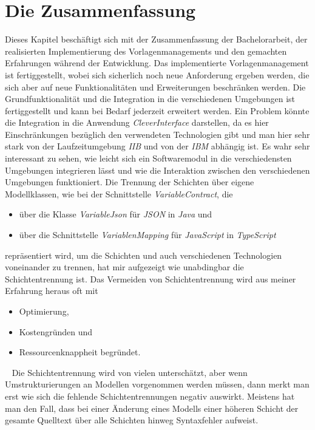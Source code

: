 \chapter{Die Zusammenfassung}
\label{cha:Zusammenfassung}
Dieses Kapitel beschäftigt sich mit der Zusammenfassung der Bachelorarbeit, der realisierten Implementierung des Vorlagenmanagements und den gemachten Erfahrungen während der Entwicklung. Das implementierte Vorlagenmanagement ist fertiggestellt, wobei sich sicherlich noch neue Anforderung ergeben werden, die sich aber auf neue Funktionalitäten und Erweiterungen beschränken werden. Die Grundfunktionalität und die Integration in die verschiedenen Umgebungen ist fertiggestellt und kann bei Bedarf jederzeit erweitert werden. Ein Problem könnte die Integration in die Anwendung \emph{CleverInterface} darstellen, da es hier Einschränkungen bezüglich den verwendeten Technologien gibt und man hier sehr stark von der Laufzeitumgebung \emph{IIB} und von der \emph{IBM} abhängig ist. 
\newline
\newline
Es wahr sehr interessant zu sehen, wie leicht sich ein Softwaremodul in die verschiedensten Umgebungen integrieren lässt und wie die Interaktion zwischen den verschiedenen Umgebungen funktioniert. Die Trennung der Schichten über eigene Modellklassen, wie bei der Schnittstelle \emph{VariableContract}, die 
\begin{itemize}
	\item über die Klasse \emph{VariableJson} für \emph{JSON} in \emph{Java} und
	\item über die Schnittstelle \emph{VariablenMapping} für \emph{JavaScript} in \emph{TypeScript}
\end{itemize}
repräsentiert wird, um die Schichten und auch verschiedenen Technologien voneinander zu trennen, hat mir aufgezeigt wie unabdingbar die Schichtentrennung ist. Das Vermeiden von Schichtentrennung wird aus meiner Erfahrung heraus oft mit 
\begin{itemize}
	\item Optimierung,
	\item Kostengründen und
	\item Ressourcenknappheit begründet.
\end{itemize}
\ \newline
Die Schichtentrennung wird von vielen unterschätzt, aber wenn Umstrukturierungen an Modellen vorgenommen werden müssen, dann merkt man erst wie sich die fehlende Schichtentrennungen negativ auswirkt. Meistens hat man den Fall, dass bei einer Änderung eines Modells einer höheren Schicht der gesamte Quelltext über alle Schichten hinweg Syntaxfehler aufweist.
